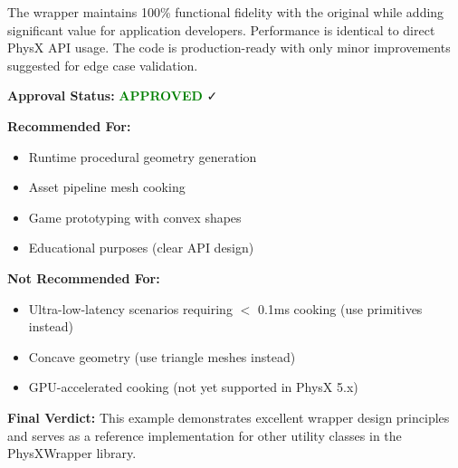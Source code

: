 The wrapper maintains 100\% functional fidelity with the original while adding significant value for application developers. Performance is identical to direct PhysX API usage. The code is production-ready with only minor improvements suggested for edge case validation.

\textbf{Approval Status:} \textcolor{green}{\textbf{APPROVED}} ✓

\textbf{Recommended For:}
\begin{itemize}
    \item Runtime procedural geometry generation
    \item Asset pipeline mesh cooking
    \item Game prototyping with convex shapes
    \item Educational purposes (clear API design)
\end{itemize}

\textbf{Not Recommended For:}
\begin{itemize}
    \item Ultra-low-latency scenarios requiring $<$ 0.1ms cooking (use primitives instead)
    \item Concave geometry (use triangle meshes instead)
    \item GPU-accelerated cooking (not yet supported in PhysX 5.x)
\end{itemize}

\vspace{0.5cm}

\textbf{Final Verdict:} This example demonstrates excellent wrapper design principles and serves as a reference implementation for other utility classes in the PhysXWrapper library.

